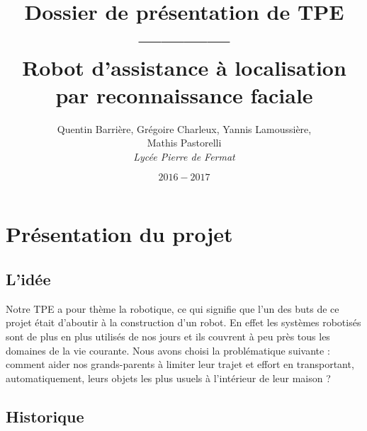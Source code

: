 \documentclass[12pt,a4paper]{article}
\author{Quentin Barri\`ere, Gr\'egoire Charleux, Yannis Lamoussi\`ere,\\ Mathis Pastorelli \\[0.2cm]
\emph{Lycée Pierre de Fermat}}
\date{\(2016-2017\)}
\begin{document}
	\title{\Huge Dossier de pr\'esentation de TPE \\ ------------ \\ \Large Robot d'assistance \`a localisation par reconnaissance faciale}
	\maketitle
	
	\newpage
	
	\tableofcontents
	
	\newpage
	
	\section{Présentation du projet}
	
	\subsection{L'idée}
	
	Notre TPE a pour thème la robotique, ce qui signifie que l'un des buts de ce projet était d'aboutir à la construction d'un robot. En effet les systèmes robotisés sont de plus en plus utilisés de nos jours et ils couvrent à peu près tous les domaines de la vie courante. Nous avons choisi la problématique suivante : comment aider nos grands-parents à limiter leur trajet et effort en transportant, automatiquement, leurs objets les plus usuels à l’intérieur de leur maison ?
	
	\subsection{Historique}
	
\end{document}
